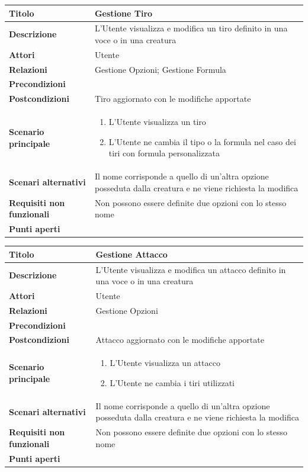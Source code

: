 \documentclass[a4paper, 11pt]{article}
\begin{document}
\begin{center}
\vspace{3em}

\begin{tabular}{ |p{5cm}|p{9.5cm}|  }
\hline
\textbf{Titolo} & Gestione Tiro \\
\hline
\textbf{Descrizione} & L'Utente visualizza e modifica un tiro definito in una voce o in una creatura \\
\hline
\textbf{Attori} & Utente  \\
\hline
\textbf{Relazioni} & Gestione Opzioni; Gestione Formula \\
\hline
\textbf{Precondizioni} &  \\
\hline
\textbf{Postcondizioni} & Tiro aggiornato con le modifiche apportate \\
\hline
\textbf{Scenario principale} & 
\begin{enumerate}
    \item L'Utente visualizza un tiro
    \item L'Utente ne cambia il tipo o la formula nel caso dei tiri con formula personalizzata
\end{enumerate}
\\
\hline
\textbf{Scenari alternativi} &Il nome corrisponde a quello di un'altra opzione posseduta dalla creatura e ne viene richiesta la modifica \\
\hline
    \textbf{Requisiti non funzionali} & Non possono essere definite due opzioni con lo stesso nome \\
\hline
\textbf{Punti aperti} &  \\
\hline
\end{tabular}

\vspace{3em}

\begin{tabular}{ |p{5cm}|p{9.5cm}|  }
\hline
\textbf{Titolo} & Gestione Attacco \\
\hline
\textbf{Descrizione} & L'Utente visualizza e modifica un attacco definito in una voce o in una creatura \\
\hline
\textbf{Attori} & Utente  \\
\hline
\textbf{Relazioni} & Gestione Opzioni\\
\hline
\textbf{Precondizioni} &  \\
\hline
\textbf{Postcondizioni} & Attacco aggiornato con le modifiche apportate \\
\hline
\textbf{Scenario principale} & 
\begin{enumerate}
    \item L'Utente visualizza un attacco
    \item L'Utente ne cambia i tiri utilizzati
\end{enumerate}
\\
\hline
\textbf{Scenari alternativi} &Il nome corrisponde a quello di un'altra opzione posseduta dalla creatura e ne viene richiesta la modifica \\
\hline
    \textbf{Requisiti non funzionali} & Non possono essere definite due opzioni con lo stesso nome \\
\hline
\textbf{Punti aperti} &  \\
\hline
\end{tabular}


\end{center}
\end{document}
